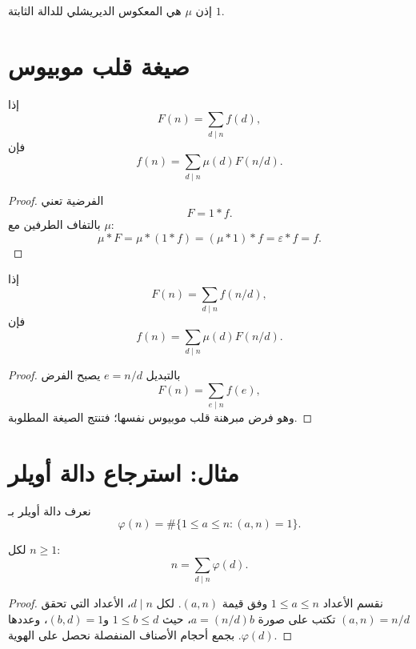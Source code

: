 إذن \(\mu\) هي المعكوس الديريشلي للدالة الثابتة \(1\).

\section{صيغة قلب موبيوس}

\begin{theorem}
\label{thm:mobius-inversion}
\provedhere
إذا
\[
F(n)=\sum_{d\mid n}f(d),
\]
فإن
\[
f(n)=\sum_{d\mid n}\mu(d)F(n/d).
\]
\end{theorem}

\begin{proof}
الفرضية تعني
\[
F=1*f.
\]
بالتفاف الطرفين مع \(\mu\):
\[
\mu*F
=
\mu*(1*f)
=
(\mu*1)*f
=
\varepsilon*f
=
f.
\]
\end{proof}

\begin{corollary}
\label{cor:mobius-inversion-equivalent-form}
\provedhere
إذا
\[
F(n)=\sum_{d\mid n}f(n/d),
\]
فإن
\[
f(n)=\sum_{d\mid n}\mu(d)F(n/d).
\]
\end{corollary}

\begin{proof}
بالتبديل \(e=n/d\) يصبح الفرض
\[
F(n)=\sum_{e\mid n}f(e),
\]
وهو فرض مبرهنة قلب موبيوس نفسها؛ فتنتج الصيغة المطلوبة.
\end{proof}

\section{مثال: استرجاع دالة أويلر}

نعرف دالة أويلر بـ
\[
\varphi(n)
=
\#\{1\leq a\leq n:(a,n)=1\}.
\]

\begin{theorem}
\label{thm:euler-totient-divisor-sum}
\provedhere
لكل \(n\geq1\):
\[
n=\sum_{d\mid n}\varphi(d).
\]
\end{theorem}

\begin{proof}
نقسم الأعداد \(1\leq a\leq n\) وفق قيمة \((a,n)\). لكل \(d\mid n\)،
الأعداد التي تحقق \((a,n)=n/d\) تكتب على صورة \(a=(n/d)b\)، حيث
\(1\leq b\leq d\) و\((b,d)=1\)، وعددها \(\varphi(d)\). بجمع أحجام
الأصناف المنفصلة نحصل على الهوية.
\end{proof}

